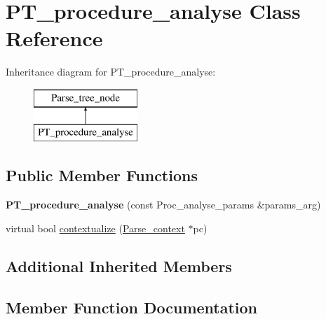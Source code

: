 \hypertarget{classPT__procedure__analyse}{}\section{P\+T\+\_\+procedure\+\_\+analyse Class Reference}
\label{classPT__procedure__analyse}
Inheritance diagram for P\+T\+\_\+procedure\+\_\+analyse\+:\begin{figure}[H]
\begin{center}
\leavevmode
\includegraphics[height=2.000000cm]{classPT__procedure__analyse}
\end{center}
\end{figure}
\subsection*{Public Member Functions}
\begin{DoxyCompactItemize}
\item 
\mbox{\label{classPT__procedure__analyse_a4e2940f6c6a59e11431abde0539ee59f}} 
{\bfseries P\+T\+\_\+procedure\+\_\+analyse} (const Proc\+\_\+analyse\+\_\+params \&params\+\_\+arg)
\item 
virtual bool \mbox{\hyperlink{classPT__procedure__analyse_adc0b9d5af360185f2861900cfec8aa30}{contextualize}} (\mbox{\hyperlink{structParse__context}{Parse\+\_\+context}} $\ast$pc)
\end{DoxyCompactItemize}
\subsection*{Additional Inherited Members}


\subsection{Member Function Documentation}
\mbox{\label{classPT__procedure__analyse_adc0b9d5af360185f2861900cfec8aa30}} 
